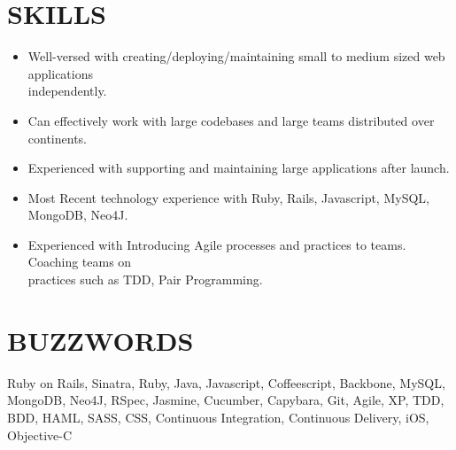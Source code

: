 \documentclass{res}
\begin{document}
\begin{resume}
\section{SKILLS} \vspace{0.15in}         
 \begin{itemize} \itemsep 0pt  
 \setlength{\itemindent}{-1.8em}
\item Well-versed with creating/deploying/maintaining small to medium sized web applications\\ independently.
\item Can effectively work with large codebases and large teams distributed over continents.
\item Experienced with supporting and maintaining large applications after launch.
\item Most Recent technology experience with Ruby, Rails, Javascript, MySQL, MongoDB, Neo4J. 
\item Experienced with Introducing Agile processes and practices to teams. Coaching teams on \\practices such as TDD, Pair Programming.

 \end{itemize}

\vspace{0.05in}         
\section{BUZZWORDS}\vspace{0.15in}
Ruby on Rails, Sinatra, Ruby, Java, Javascript, Coffeescript, Backbone, MySQL, MongoDB, Neo4J, RSpec, Jasmine, Cucumber, Capybara, Git, Agile, XP, TDD, BDD, HAML, SASS, CSS, Continuous Integration, Continuous Delivery, iOS, Objective-C
 
\end{resume}
\end{document}
